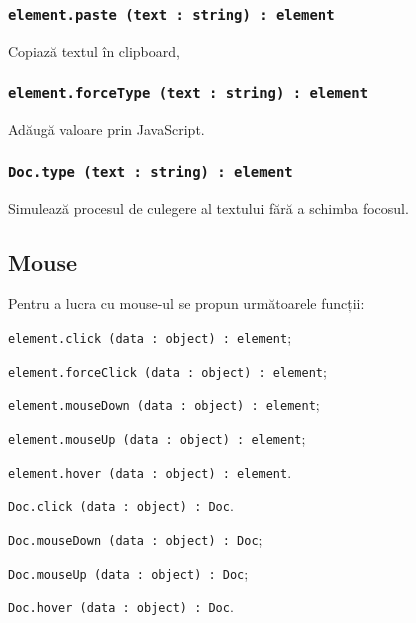 \subsubsection{\lstinline|element.paste (text : string) : element|}

Copiază textul în clipboard, 

\subsubsection{\lstinline|element.forceType (text : string) : element|}

Adăugă valoare prin JavaScript.

\subsubsection{\lstinline|Doc.type (text : string) : element|}

Simulează procesul de culegere al textului fără a schimba focosul.

\subsection{Mouse}
\label{mouse}

Pentru a lucra cu mouse-ul se propun următoarele funcții:
\begin{icItems}
	\item \lstinline|element.click (data : object) : element|;
	\item \lstinline|element.forceClick (data : object) : element|;
	\item \lstinline|element.mouseDown (data : object) : element|;
	\item \lstinline|element.mouseUp (data : object) : element|;
	\item \lstinline|element.hover (data : object) : element|.
	\item \lstinline|Doc.click (data : object) : Doc|.
	\item \lstinline|Doc.mouseDown (data : object) : Doc|;
	\item \lstinline|Doc.mouseUp (data : object) : Doc|;
	\item \lstinline|Doc.hover (data : object) : Doc|.
\end{icItems}

